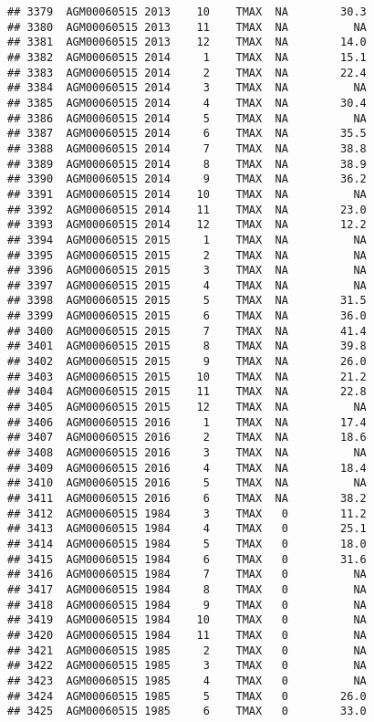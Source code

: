 \documentclass{article}\usepackage[]{graphicx}\usepackage[]{color}
\makeatletter
\newenvironment{kframe}{%
 \def\at@end@of@kframe{}%
 \ifinner\ifhmode%
  \def\at@end@of@kframe{\end{minipage}}%
  \begin{minipage}{\columnwidth}%
 \fi\fi%
 \def\FrameCommand##1{\hskip\@totalleftmargin \hskip-\fboxsep
 \colorbox{shadecolor}{##1}\hskip-\fboxsep
     \hskip-\linewidth \hskip-\@totalleftmargin \hskip\columnwidth}%
 \MakeFramed {\advance\hsize-\width
   \@totalleftmargin\z@ \linewidth\hsize
   \@setminipage}}%
 {\par\unskip\endMakeFramed%
 \at@end@of@kframe}
\newenvironment{knitrout}{}{} %
\makeatother
\begin{document}
\begin{knitrout}
\begin{kframe}
\begin{verbatim}
## 3379  AGM00060515 2013    10    TMAX  NA        30.3
## 3380  AGM00060515 2013    11    TMAX  NA          NA
## 3381  AGM00060515 2013    12    TMAX  NA        14.0
## 3382  AGM00060515 2014     1    TMAX  NA        15.1
## 3383  AGM00060515 2014     2    TMAX  NA        22.4
## 3384  AGM00060515 2014     3    TMAX  NA          NA
## 3385  AGM00060515 2014     4    TMAX  NA        30.4
## 3386  AGM00060515 2014     5    TMAX  NA          NA
## 3387  AGM00060515 2014     6    TMAX  NA        35.5
## 3388  AGM00060515 2014     7    TMAX  NA        38.8
## 3389  AGM00060515 2014     8    TMAX  NA        38.9
## 3390  AGM00060515 2014     9    TMAX  NA        36.2
## 3391  AGM00060515 2014    10    TMAX  NA          NA
## 3392  AGM00060515 2014    11    TMAX  NA        23.0
## 3393  AGM00060515 2014    12    TMAX  NA        12.2
## 3394  AGM00060515 2015     1    TMAX  NA          NA
## 3395  AGM00060515 2015     2    TMAX  NA          NA
## 3396  AGM00060515 2015     3    TMAX  NA          NA
## 3397  AGM00060515 2015     4    TMAX  NA          NA
## 3398  AGM00060515 2015     5    TMAX  NA        31.5
## 3399  AGM00060515 2015     6    TMAX  NA        36.0
## 3400  AGM00060515 2015     7    TMAX  NA        41.4
## 3401  AGM00060515 2015     8    TMAX  NA        39.8
## 3402  AGM00060515 2015     9    TMAX  NA        26.0
## 3403  AGM00060515 2015    10    TMAX  NA        21.2
## 3404  AGM00060515 2015    11    TMAX  NA        22.8
## 3405  AGM00060515 2015    12    TMAX  NA          NA
## 3406  AGM00060515 2016     1    TMAX  NA        17.4
## 3407  AGM00060515 2016     2    TMAX  NA        18.6
## 3408  AGM00060515 2016     3    TMAX  NA          NA
## 3409  AGM00060515 2016     4    TMAX  NA        18.4
## 3410  AGM00060515 2016     5    TMAX  NA          NA
## 3411  AGM00060515 2016     6    TMAX  NA        38.2
## 3412  AGM00060515 1984     3    TMAX   0        11.2
## 3413  AGM00060515 1984     4    TMAX   0        25.1
## 3414  AGM00060515 1984     5    TMAX   0        18.0
## 3415  AGM00060515 1984     6    TMAX   0        31.6
## 3416  AGM00060515 1984     7    TMAX   0          NA
## 3417  AGM00060515 1984     8    TMAX   0          NA
## 3418  AGM00060515 1984     9    TMAX   0          NA
## 3419  AGM00060515 1984    10    TMAX   0          NA
## 3420  AGM00060515 1984    11    TMAX   0          NA
## 3421  AGM00060515 1985     2    TMAX   0          NA
## 3422  AGM00060515 1985     3    TMAX   0          NA
## 3423  AGM00060515 1985     4    TMAX   0          NA
## 3424  AGM00060515 1985     5    TMAX   0        26.0
## 3425  AGM00060515 1985     6    TMAX   0        33.0

\end{verbatim}
\end{kframe}
\end{knitrout}
\end{document}
